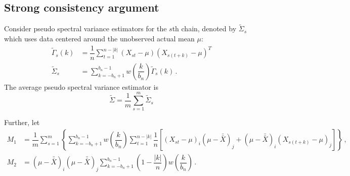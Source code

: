 \documentclass[11pt]{article}
\newcommand{\E}{\mathbb{E}}
\newcommand{\Var}{\text{Var}}
\theoremstyle{remark}
\begin{document}



\subsection{Strong consistency argument} \label{appendix:strong_consis}


Consider pseudo spectral variance estimators for the $s$th chain, denoted by $\tilde{\Sigma}_s$ which uses data centered around the unobserved actual mean $\mu$:
\begin{align*}
    \tilde{\Gamma}_s(k) &= \dfrac{1}{n}\sum_{t=1}^{n-|k|}(X_{st}-\mu)(X_{s(t+k)}-\mu)^T \\ 
    \tilde{\Sigma}_s &= \sum_{k=-b_n+1}^{b_n-1}w\left(\dfrac{k}{b_n}\right)\tilde{\Gamma}_s(k) \,.
\end{align*}
%
The average pseudo spectral variance estimator is
\[
\tilde{\Sigma} = \dfrac{1}{m}\sum\limits_{s=1}^{m}\tilde{\Sigma}_s
\]

Further, let
\begin{align*}
  M_1 & = \dfrac{1}{m}\sum\limits_{s=1}^{m}\left\{\sum\limits_{k=-b_n+1}^{b_n-1}w\left(\dfrac{k}{b_n}\right)\sum\limits_{t=1}^{n-|k|}\dfrac{1}{n}\left[ \left(X_{st}-\mu \right)_i   \left(\mu-\bar{\bar{X}} \right)_j +    \left(\mu-\bar{\bar{X}} \right)_i  \left(X_{s(t+k)}-\mu \right)_j \right]\right\}\,, \\ 
M_2 &= \left(\mu-\bar{\bar{X}} \right)_i   \left(\mu-\bar{\bar{X}} \right)_j\sum\limits_{k=-b_n+1}^{b_n-1}\left(1-\dfrac{|k|}{n}\right)w\left(\dfrac{k}{b_n}\right)\,.
\end{align*}
\end{document}
